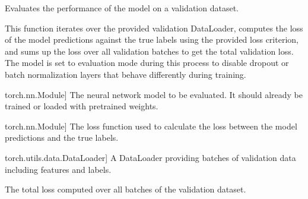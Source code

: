 \documentclass[letterpaper,10pt,english]{sphinxmanual}
\begin{document}
\begin{fulllineitems}
\label{\detokenize{insur_FL_client:insur_FL_client.test}}
\pysigstartsignatures
{}
\pysigstopsignatures
\sphinxAtStartPar
Evaluates the performance of the model on a validation dataset.

\sphinxAtStartPar
This function iterates over the provided validation DataLoader, computes the loss of the model predictions
against the true labels using the provided loss criterion, and sums up the loss over all validation batches
to get the total validation loss. The model is set to evaluation mode during this process to disable dropout
or batch normalization layers that behave differently during training.
\begin{description}
\begin{description}
\sphinxlineitem{model}{[}torch.nn.Module{]}
\sphinxAtStartPar
The neural network model to be evaluated. It should already be trained or loaded with pre\sphinxhyphen{}trained weights.

\sphinxlineitem{criterion}{[}torch.nn.Module{]}
\sphinxAtStartPar
The loss function used to calculate the loss between the model predictions and the true labels.

\sphinxlineitem{val\_loader}{[}torch.utils.data.DataLoader{]}
\sphinxAtStartPar
A DataLoader providing batches of validation data including features and labels.

\end{description}

\begin{description}
\sphinxAtStartPar
The total loss computed over all batches of the validation dataset.

\end{description}


\end{description}
\end{fulllineitems}
\end{document}
